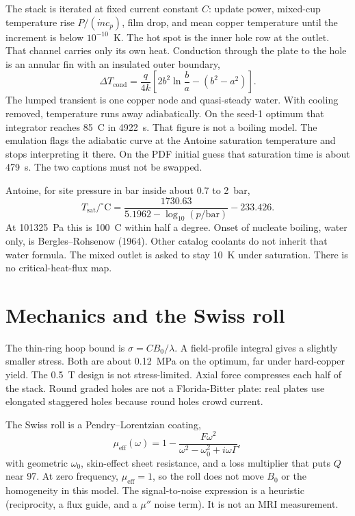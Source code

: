 \documentclass[11pt]{article}
\begin{document}
The stack is iterated at fixed current constant $C$: update power, mixed-cup temperature rise $P/(\dot m c_p)$, film drop, and mean copper temperature until the increment is below $10^{-10}$~K.
The hot spot is the inner hole row at the outlet.
That channel carries only its own heat.
Conduction through the plate to the hole is an annular fin with an insulated outer boundary,
\begin{equation}
\Delta T_{\mathrm{cond}} = \frac{q}{4k}\left[2b^2\ln\frac{b}{a}-(b^2-a^2)\right].
\end{equation}
The lumped transient is one copper node and quasi-steady water.
With cooling removed, temperature runs away adiabatically.
On the seed-1 optimum that integrator reaches 85~C in 4922~s.
That figure is not a boiling model.
The emulation flags the adiabatic curve at the Antoine saturation temperature and stops interpreting it there.
On the PDF initial guess that saturation time is about 479~s.
The two captions must not be swapped.

Antoine, for site pressure in bar inside about 0.7 to 2~bar,
\begin{equation}
T_{\mathrm{sat}}/^\circ\mathrm{C} = \frac{1730.63}{5.1962-\log_{10}(p/\mathrm{bar})}-233.426.
\end{equation}
At 101325~Pa this is 100~C within half a degree.
Onset of nucleate boiling, water only, is Bergles--Rohsenow (1964).
Other catalog coolants do not inherit that water formula.
The mixed outlet is asked to stay 10~K under saturation.
There is no critical-heat-flux map.

\section{Mechanics and the Swiss roll}

The thin-ring hoop bound is $\sigma = C B_0/\lambda$.
A field-profile integral gives a slightly smaller stress.
Both are about 0.12~MPa on the optimum, far under hard-copper yield.
The 0.5~T design is not stress-limited.
Axial force compresses each half of the stack.
Round graded holes are not a Florida-Bitter plate: real plates use elongated staggered holes because round holes crowd current.

The Swiss roll is a Pendry--Lorentzian coating,
\begin{equation}
\mu_{\mathrm{eff}}(\omega)=1-\frac{F\omega^2}{\omega^2-\omega_0^2+i\omega\Gamma},
\end{equation}
with geometric $\omega_0$, skin-effect sheet resistance, and a loss multiplier that puts $Q$ near 97.
At zero frequency, $\mu_{\mathrm{eff}}=1$, so the roll does not move $B_0$ or the homogeneity in this model.
The signal-to-noise expression is a heuristic (reciprocity, a flux guide, and a $\mu''$ noise term).
It is not an MRI measurement.
\end{document}
